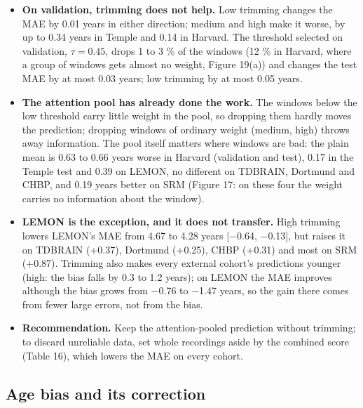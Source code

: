 \documentclass[11pt,a4paper]{article}
\begin{document}
\begin{itemize}
\item \textbf{On validation, trimming does not help.} Low trimming changes the MAE by 0.01 years in either direction; medium and high make it worse, by up to 0.34 years in Temple and 0.14 in Harvard. The threshold selected on validation, $\tau = 0.45$, drops 1 to 3 \% of the windows (12 \% in Harvard, where a group of windows gets almost no weight, Figure 19(a)) and changes the test MAE by at most 0.03 years; low trimming by at most 0.05 years.
\item \textbf{The attention pool has already done the work.} The windows below the low threshold carry little weight in the pool, so dropping them hardly moves the prediction; dropping windows of ordinary weight (medium, high) throws away information. The pool itself matters where windows are bad: the plain mean is 0.63 to 0.66 years worse in Harvard (validation and test), 0.17 in the Temple test and 0.39 on LEMON, no different on TDBRAIN, Dortmund and CHBP, and 0.19 years better on SRM (Figure 17: on these four the weight carries no information about the window).
\item \textbf{LEMON is the exception, and it does not transfer.} High trimming lowers LEMON's MAE from 4.67 to 4.28 years [$-$0.64, $-$0.13], but raises it on TDBRAIN (+0.37), Dortmund (+0.25), CHBP (+0.31) and most on SRM (+0.87). Trimming also makes every external cohort's predictions younger (high: the bias falls by 0.3 to 1.2 years); on LEMON the MAE improves although the bias grows from $-$0.76 to $-$1.47 years, so the gain there comes from fewer large errors, not from the bias.
\item \textbf{Recommendation.} Keep the attention-pooled prediction without trimming; to discard unreliable data, set whole recordings aside by the combined score (Table 16), which lowers the MAE on every cohort.
\end{itemize}

\subsection{Age bias and its correction}
\end{document}
